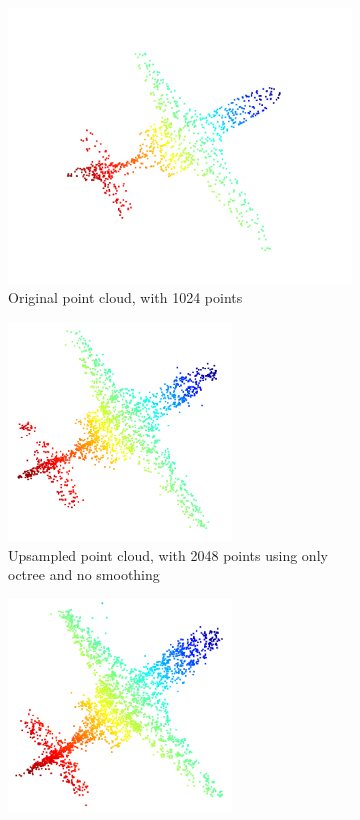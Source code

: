 \begin{figure}[h]
	\centering
	\begin{subfigure}{0.3\textwidth}
		\centering
		\includegraphics[width=\textwidth]{1024_no_upsampling.png}
		\caption{Original point cloud, with 1024 points}
	\end{subfigure}
	\begin{subfigure}{0.3\textwidth}
		\centering
		\includegraphics[width=0.65\textwidth]{./2048_octree_no_smoothing.png}
		\caption{Upsampled point cloud, with 2048 points using only octree and no smoothing}
	\end{subfigure}
	\begin{subfigure}{0.3\textwidth}
		\centering
		\includegraphics[width=0.65\textwidth]{./4096_octree_no_smoothing.png}

\end{subfigure}
\end{figure}
